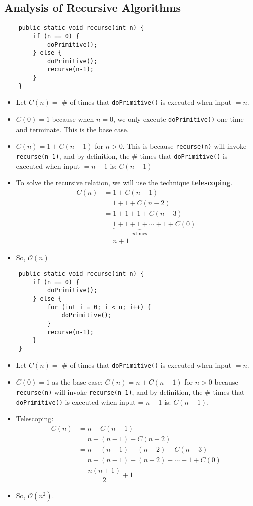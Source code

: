 \documentclass[12pt, a4paper]{article}
\def\O{\mathcal{O}}
\begin{document}
\subsection*{Analysis of Recursive Algorithms}
\begin{lstlisting}
	public static void recurse(int n) {
		if (n == 0) {
			doPrimitive();
		} else {
			doPrimitive();
			recurse(n-1);
		}
	}
\end{lstlisting}
\begin{itemize}
	\item Let $C(n)=$ \# of times that \texttt{doPrimitive()} is executed when input $=n$.
	\item $C(0)=1$ because when $n=0$, we only execute \texttt{doPrimitive()} one time and terminate. This is the base case. 
	\item $C(n)=1+C(n-1)$ for $n>0$. This is because \texttt{recurse(n)} will invoke \texttt{recurse(n-1)}, and by definition, the \# times that \texttt{doPrimitive()} is executed when input $=n-1$ is: $C(n-1)$
	\item To solve the recursive relation, we will use the technique \textbf{telescoping}.
	\begin{align*}
		C(n)&=1+C(n-1)\\
		&=1+1+C(n-2)\\
		&=1+1+1+C(n-3)\\
		&=\underbrace{1+1+1+\cdots+1}_{n\text {times}}+C(0)\\
		&=n+1
	\end{align*}
	\item So, $\O(n)$

\end{itemize}
\begin{lstlisting}
	public static void recurse(int n) {
		if (n == 0) {
			doPrimitive();
		} else {
			for (int i = 0; i < n; i++) {
				doPrimitive();
			}
			recurse(n-1);
		}
	}
\end{lstlisting}
\begin{itemize}
	\item Let $C(n)=$ \# of times that \texttt{doPrimitive()} is executed when input $=n$.
	\item $C(0)=1$ as the base case; $C(n)=n+C(n-1)$ for $n>0$ because \texttt{recurse(n)} will invoke \texttt{recurse(n-1)}, and by definition, the \# times that \texttt{doPrimitive()} is executed when input = $n-1$ is: $C(n-1)$.
	\item Telescoping: \begin{align*}
		C(n)&=n+C(n-1)\\
		&=n+(n-1)+C(n-2)\\
		&=n+(n-1)+(n-2)+C(n-3)\\
		&=n+(n-1)+(n-2)+\cdots+1+C(0)\\
		&=\dfrac{n(n+1)}{2}+1
 	\end{align*}
	\item So, $\O(n^2)$.
\end{itemize}
\end{document}
